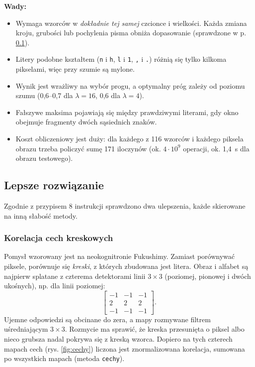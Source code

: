 \documentclass[12pt]{article}
\begin{document}
\textbf{Wady:}
\begin{itemize}
    \item Wymaga wzorców w \emph{dokładnie tej samej} czcionce i wielkości. Każda zmiana kroju, grubości lub pochylenia pisma obniża dopasowanie (sprawdzone w p. \ref{sec:lepsze}).
    \item Litery podobne kształtem (\texttt{n} i \texttt{h}, \texttt{l} i \texttt{1}, \texttt{,} i \texttt{.}) różnią się tylko kilkoma pikselami, więc przy szumie są mylone.
    \item Wynik jest wrażliwy na wybór progu, a optymalny próg zależy od poziomu szumu (0,6--0,7 dla $\lambda=16$, 0,6 dla $\lambda=4$).
    \item Fałszywe maksima pojawiają się między prawdziwymi literami, gdy okno obejmuje fragmenty dwóch sąsiednich znaków.
    \item Koszt obliczeniowy jest duży: dla każdego z 116 wzorców i każdego piksela obrazu trzeba policzyć sumę 171 iloczynów (ok. $4\cdot10^9$ operacji, ok. 1,4~s dla obrazu testowego).
\end{itemize}

\subsection{Lepsze rozwiązanie} \label{sec:lepsze}

Zgodnie z przypisem 8 instrukcji sprawdzono dwa ulepszenia, każde skierowane na inną słabość metody.

\subsubsection{Korelacja cech kreskowych}

Pomysł wzorowany jest na neokognitronie Fukushimy. Zamiast porównywać piksele, porównuje się \emph{kreski}, z których zbudowana jest litera. Obraz i alfabet są najpierw splatane z czterema detektorami linii $3\times3$ (poziomej, pionowej i dwóch ukośnych), np. dla linii poziomej:
\[
    \begin{bmatrix} -1 & -1 & -1 \\ 2 & 2 & 2 \\ -1 & -1 & -1 \end{bmatrix}.
\]
Ujemne odpowiedzi są obcinane do zera, a mapy rozmywane filtrem uśredniającym $3\times3$. Rozmycie ma sprawić, że kreska przesunięta o piksel albo nieco grubsza nadal pokrywa się z kreską wzorca. Dopiero na tych czterech mapach cech (rys. \ref{fig:cechy}) liczona jest znormalizowana korelacja, sumowana po wszystkich mapach (metoda \texttt{cechy}).
\end{document}
